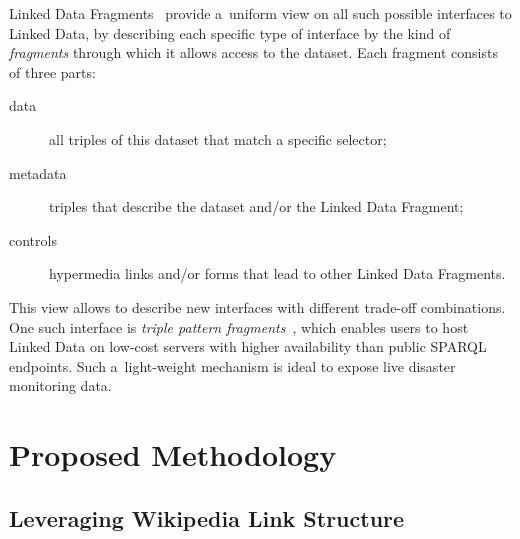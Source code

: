 \documentclass[letterpaper]{article}
\begin{document}
Linked Data Fragments~\cite{verborgh2014ldfiswc}
provide a~uniform view on all such possible interfaces to Linked Data,
by describing each specific type of interface
by the kind of \emph{fragments} through which it allows access to the dataset.
Each fragment consists of three parts:
\begin{description}
  \item[data] all triples of this dataset that match a specific selector;
  \item[metadata] triples that describe the dataset and/or the Linked Data Fragment;
  \item[controls] hypermedia links and/or forms that lead to other Linked Data Fragments.
\end{description}
This view allows to describe new interfaces
with different trade-off combinations.
One such interface is \emph{triple pattern fragments}~\cite{verborgh2014ldfiswc},
which enables users to host Linked Data
on low-cost servers with higher availability
than public SPARQL endpoints.
Such a~light-weight mechanism is ideal to expose live disaster monitoring data.

\section{Proposed Methodology}
\label{sec:Methodology}

\subsection{Leveraging Wikipedia Link Structure}
\end{document}
